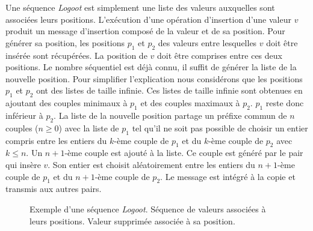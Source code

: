 Une séquence \emph{Logoot} est simplement une liste des valeurs auxquelles sont associées leurs positions.
L'exécution d'une opération d'insertion d'une valeur $v$ produit un message d'insertion composé de la valeur et de sa position.
Pour générer sa position, les positions $p_1$ et $p_2$ des valeurs entre lesquelles $v$ doit être insérée sont récupérées.
La position de $v$ doit être comprises entre ces deux positions.
Le nombre séquentiel est déjà connu, il suffit de générer la liste de la nouvelle position.
Pour simplifier l'explication nous considérons que les positions $p_1$ et $p_2$ ont des listes de taille infinie.
Ces listes de taille infinie sont obtenues en ajoutant des couples minimaux à $p_1$ et des couples maximaux à $p_2$.
$p_1$ reste donc inférieur à $p_2$.
La liste de la nouvelle position partage un préfixe commun de $n$ couples ($n \geq 0$) avec la liste de $p_1$ tel qu'il ne soit pas possible de choisir un entier compris entre les entiers du $k$-ème couple de $p_1$ et du $k$-ème couple de $p_2$ avec $k \leq n$.
Un $n+1$-ème couple est ajouté à la liste.
Ce couple est généré par le pair qui insère $v$.
Son entier est choisit aléatoirement entre les entiers du $n+1$-ème couple de $p_1$ et du $n+1$-ème couple de $p_2$.
Le message est intégré à la copie et transmis aux autres pairs.

\begin{figure}[tb]
\centering
\begin{subfigure}[b]{0.69\linewidth}
    \centering
    \caption{}
    \label{fig:logoot-1}
\end{subfigure}
\begin{subfigure}[b]{0.29\linewidth}
    \centering
    \caption{}
    \label{fig:logoot-2}
\end{subfigure}
\caption[Exemple d'une séquence \emph{Logoot}]{Exemple d'une séquence \emph{Logoot}.
 Séquence de valeurs associées à leurs positions.
 Valeur supprimée associée à sa position.}
\label{fig:logoot}
\end{figure}

